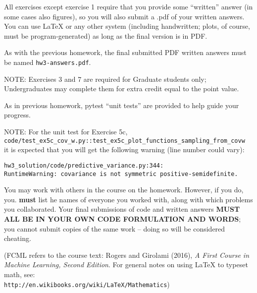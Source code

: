 \documentclass[10pt]{article}
\newcommand{\latex}{\LaTeX\xspace}
\begin{document}
All exercises except exercise 1 require that you provide some ``written'' answer (in some cases also figures), so you will also submit a .pdf of your written answers.  You can use \latex or any other system (including handwritten; plots, of course, must be program-generated) as long as the final version is in PDF. 

As with the previous homework, the final submitted PDF written answers must be named {\tt hw3-answers.pdf}.

NOTE: Exercises 3 and 7 are required for Graduate students only; Undergraduates may complete them for extra credit equal to the point value.

As in previous homework, pytest ``unit tests'' are provided to help guide your progress.

NOTE: For the unit test for Exercise 5c,\\
{\tt code/test\_ex5c\_cov\_w.py::test\_ex5c\_plot\_functions\_sampling\_from\_covw}\\
it is expected that you will get the following warning (line number could vary):

\begin{verbatim}
hw3_solution/code/predictive_variance.py:344: 
RuntimeWarning: covariance is not symmetric positive-semidefinite.
\end{verbatim}

You may work with others in the course on the homework. However, if you do, you. {\bf must} list he names of everyone you worked with, along with which problems you collaborated. Your final submissions of code and written answers {\bf MUST ALL BE IN YOUR OWN CODE FORMULATION AND WORDS}; you cannot submit copies of the same work -- doing so will be considered cheating.

(FCML refers to the course text: Rogers and Girolami (2016), {\em A First Course in Machine Learning, Second Edition}.  For general notes on using \latex to typeset math, see:\\ {\tt http://en.wikibooks.org/wiki/LaTeX/Mathematics})
\vspace{.5cm}

\end{document}
